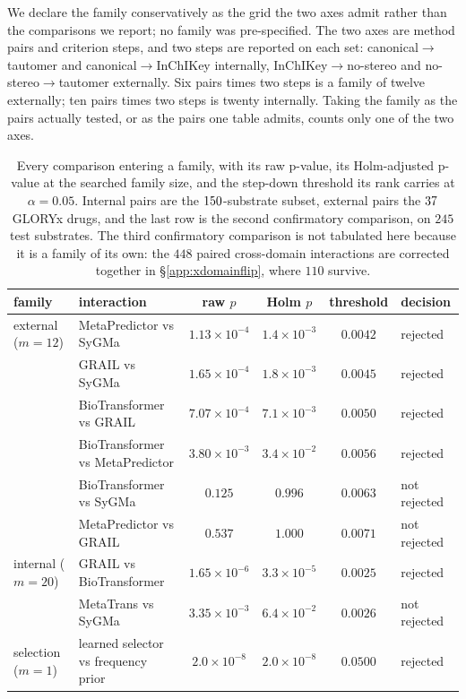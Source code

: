 We declare the family conservatively as the grid the two axes admit rather than the comparisons we
report; no family was pre-specified. The two axes are method pairs and criterion steps, and two steps are reported on each set:
canonical$\rightarrow$tautomer and canonical$\rightarrow$InChIKey internally,
InChIKey$\rightarrow$no-stereo and no-stereo$\rightarrow$tautomer externally. Six pairs times two
steps is a family of twelve externally; ten pairs times two steps is twenty internally. Taking the
family as the pairs actually tested, or as the pairs one table admits, counts only one of the two
axes.

\begin{table}[h]
\caption{Every comparison entering a family, with its raw p-value, its Holm-adjusted
p-value at the searched family size, and the step-down threshold its rank carries at
$\alpha=0.05$. Internal pairs are the $150$-substrate subset, external pairs the $37$
GLORYx drugs, and the last row is the second confirmatory comparison, on $245$ test substrates. The
third confirmatory comparison is not tabulated here because it is a family of its own: the $448$
paired cross-domain interactions are corrected together in \S\ref{app:xdomainflip}, where $110$
survive.}
\label{tab:holm}
\begin{center}
\footnotesize
\begin{tabular}{llcccl}
\toprule
family & interaction & raw $p$ & Holm $p$ & threshold & decision \\
\midrule
external ($m{=}12$) & MetaPredictor vs SyGMa          & $1.13\times10^{-4}$ & $1.4\times10^{-3}$ & $0.0042$ & rejected \\
                    & GRAIL vs SyGMa                  & $1.65\times10^{-4}$ & $1.8\times10^{-3}$ & $0.0045$ & rejected \\
                    & BioTransformer vs GRAIL         & $7.07\times10^{-4}$ & $7.1\times10^{-3}$ & $0.0050$ & rejected \\
                    & BioTransformer vs MetaPredictor & $3.80\times10^{-3}$ & $3.4\times10^{-2}$ & $0.0056$ & rejected \\
                    & BioTransformer vs SyGMa         & $0.125$             & $0.996$            & $0.0063$ & not rejected \\
                    & MetaPredictor vs GRAIL          & $0.537$             & $1.000$            & $0.0071$ & not rejected \\
\midrule
internal ($m{=}20$) & GRAIL vs BioTransformer         & $1.65\times10^{-6}$ & $3.3\times10^{-5}$ & $0.0025$ & rejected \\
                    & MetaTrans vs SyGMa              & $3.35\times10^{-3}$ & $6.4\times10^{-2}$ & $0.0026$ & not rejected \\
\midrule
selection ($m{=}1$) & learned selector vs frequency prior & $2.0\times10^{-8}$ & $2.0\times10^{-8}$ & $0.0500$ & rejected \\
\bottomrule
\end{tabular}
\end{center}
\end{table}

